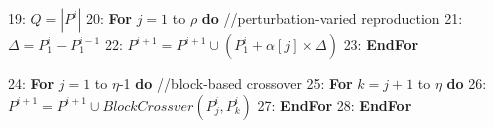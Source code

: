 \documentclass[lettersize,journal]{IEEEtran}
\begin{document}
\begin{algorithm}[t]
\begin{small}
\begin{algorithmic}[0]
				\STATE \hspace{-0.3cm} {\small 19:} \hspace{-0.05cm}  \hspace{0.25cm} $Q=|P^i|$
				\STATE \hspace{-0.3cm} {\small 20:} \hspace{-0.05cm}  \hspace{0.25cm} \textbf{For} $j=1$ to $\rho$ \textbf{do} //perturbation-varied reproduction
				\STATE \hspace{-0.3cm} {\small 21:} \hspace{-0.05cm}  \hspace{0.5cm} $\Delta=P^i_1-P^{i-1}_1$	
				\STATE \hspace{-0.3cm} {\small 22:} \hspace{-0.05cm}  \hspace{0.5cm} $P^{i+1}=P^{i+1}\cup(P^i_1+\alpha[j]\times\Delta)$
				\STATE \hspace{-0.3cm} {\small 23:} \hspace{-0.05cm}  \hspace{0.25cm}  \textbf{EndFor}
				
				\STATE \hspace{-0.3cm} {\small 24:} \hspace{-0.05cm}  \hspace{0.25cm} \textbf{For} $j=1$ to $\eta$-1 \textbf{do}  //block-based crossover
				\STATE \hspace{-0.3cm} {\small 25:} \hspace{-0.05cm}  \hspace{0.50cm} \textbf{For} $k=j+1$ to $\eta$ \textbf{do}
				\STATE \hspace{-0.3cm} {\small 26:} \hspace{-0.05cm}  \hspace{0.75cm} $P^{i+1}=P^{i+1}\cup BlockCrossver(P^i_j,P^i_k)$
				\STATE \hspace{-0.3cm} {\small 27:} \hspace{-0.05cm}  \hspace{0.5cm}  \textbf{EndFor}
				\STATE \hspace{-0.3cm} {\small 28:} \hspace{-0.05cm}  \hspace{0.25cm}  \textbf{EndFor}
				

\end{algorithmic}
\end{small}
\end{algorithm}
\end{document}
